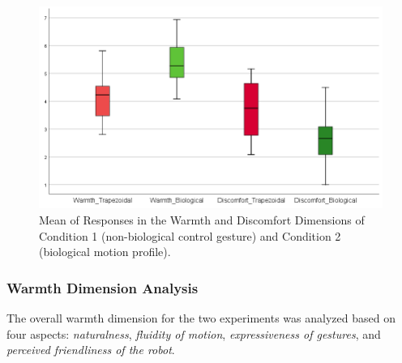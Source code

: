 \documentclass{CSSRforAfrica}
\begin{document}
\begin{figure}[t]
  \centering \includegraphics[scale=0.35]{Overall_Means.png}
  \caption{{Mean of Responses in the Warmth and Discomfort Dimensions of  Condition 1 (non-biological control gesture) and Condition 2 (biological motion profile).}}
  \label{figure:Overall_means}
\end{figure}
%
%
%

\subsubsection{Warmth Dimension Analysis}
The overall warmth dimension for the two experiments was analyzed based on four aspects: {\em naturalness}, {\em fluidity of motion}, {\em expressiveness of gestures}, and {\em perceived friendliness of the robot}. 
 
\end{document}
